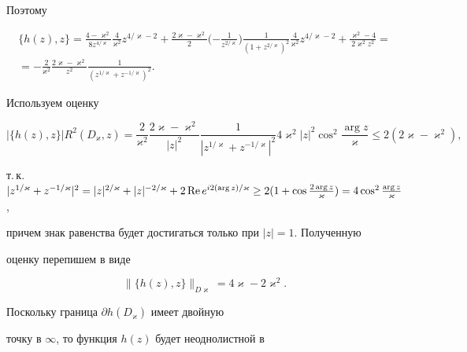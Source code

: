 Поэтому


\begin{gather*}


\{h(z),z\} =\frac{{4-\varkappa 


^2}}{{8z^{4/\varkappa}}}\frac{{4}}{{\varkappa^2}}z^{4/\varkappa-2}+


\frac{{2\varkappa-\varkappa^2}}{2}\bigg({- \frac{1}{{z^{2/\varkappa}}}} 


\bigg) \frac{1}{{({1+z^{2/\varkappa}} 


)^2}}\frac{{4}}{{\varkappa^2}}z^{4/\varkappa-2}+\frac{{\varkappa^2 


- 4}}{{2\varkappa^2z^2}}= \\


%


=-\frac{2}{{\varkappa^2}}\frac{{2\varkappa-\varkappa 


^2}}{{z^2}}\frac{1}{{({z^{1/\varkappa}+z^{- 1/\varkappa}})^2}}.


\end{gather*}


Используем оценку 


$$


|\{h(z),z\} |R^2({D_{\varkappa},z})=


\frac{2}{{\varkappa^2}}\frac{{2\varkappa-\varkappa 


^2}}{{|z|^2}}\frac{1}{{|z^{1/\varkappa}+z^{- 1/\varkappa} |^2}}4\varkappa 


^2|z|^2\cos^2\frac{{\arg z}}{{\varkappa}} \le 2({2\varkappa-\varkappa 


^2}),


$$


т.\,к. $|z^{1/\varkappa}+z^{-1/\varkappa}|^2=|z|^{2/\varkappa}+|z|^{- 


2/\varkappa}+2\re e^{i2({\arg z})/\varkappa} \ge 2({1+


\cos\frac{{2\arg z}}{{\varkappa}}})=4\cos^2\frac{{\arg z}}{{\varkappa}}$,


причем знак равенства будет достигаться только при $|z|=1$. Полученную 


оценку перепишем в виде


\begin{equation}


\|\{h(z),z\} \|_{D\varkappa}=4\varkappa-2\varkappa^2.


\end{equation}


Поскольку граница $\partial h({D_{\varkappa}} )$ имеет двойную 


точку в $\infty$, то функция $h(z)$ будет неоднолистной в 


